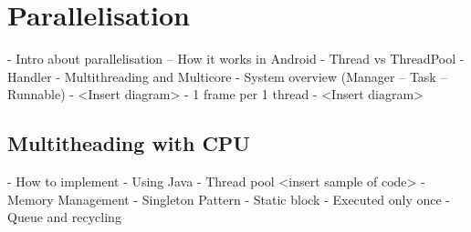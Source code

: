     \section{Parallelisation}
        -	Intro about parallelisation – How it works in Android
            - Thread vs ThreadPool
            - Handler
        -	Multithreading and Multicore
        -	System overview (Manager – Task – Runnable)
            - <Insert diagram>
        -	1 frame per 1 thread
            - <Insert diagram>

        \subsection{Multitheading with CPU}
            -	How to implement
                - Using Java
                - Thread pool
                    <insert sample of code>
            -	Memory Management
                - Singleton Pattern
                - Static block
                    - Executed only once
                - Queue and recycling

